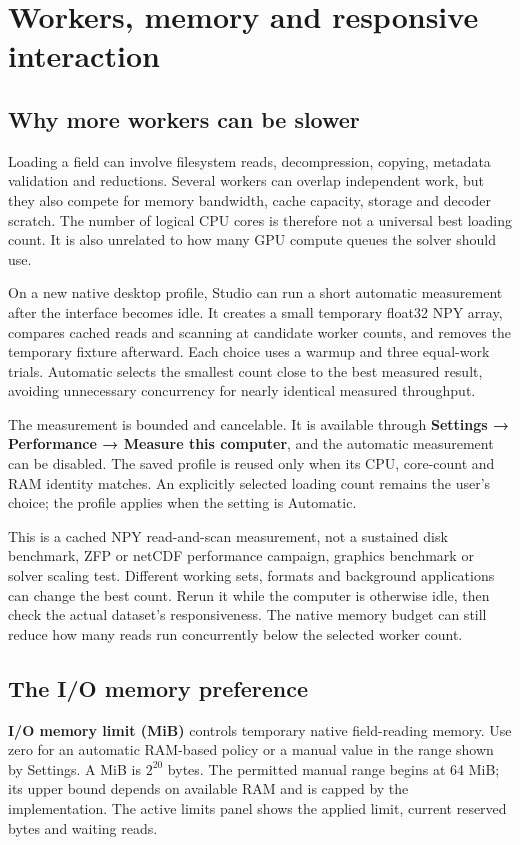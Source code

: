 \section{Workers, memory and responsive interaction}
\subsection{Why more workers can be slower}
Loading a field can involve filesystem reads, decompression, copying, metadata
validation and reductions. Several workers can overlap independent work, but
they also compete for memory bandwidth, cache capacity, storage and decoder
scratch. The number of logical CPU cores is therefore not a universal best
loading count. It is also unrelated to how many GPU compute queues the solver
should use.

On a new native desktop profile, Studio can run a short automatic measurement
after the interface becomes idle. It creates a small temporary float32 NPY
array, compares cached reads and scanning at candidate worker counts, and removes
the temporary fixture afterward. Each choice uses a warmup and three equal-work
trials. Automatic selects the smallest count close to the best measured result,
avoiding unnecessary concurrency for nearly identical measured throughput.

The measurement is bounded and cancelable. It is available through
\textbf{Settings → Performance → Measure this computer}, and the automatic
measurement can be disabled. The saved profile is reused only when its CPU,
core-count and RAM identity matches. An explicitly selected loading count
remains the user's choice; the profile applies when the setting is Automatic.

This is a cached NPY read-and-scan measurement, not a sustained disk benchmark,
ZFP or netCDF performance campaign, graphics benchmark or solver scaling test.
Different working sets, formats and background applications can change the best
count. Rerun it while the computer is otherwise idle, then check the actual
dataset's responsiveness. The native memory budget can still reduce how many
reads run concurrently below the selected worker count.

\subsection{The I/O memory preference}
\textbf{I/O memory limit (MiB)} controls temporary native field-reading memory.
Use zero for an automatic RAM-based policy or a manual value in the range shown
by Settings. A MiB is $2^{20}$ bytes. The permitted manual range begins at
64 MiB; its upper bound depends on available RAM and is capped by the implementation.
The active limits panel shows the applied limit, current reserved bytes and
waiting reads.

